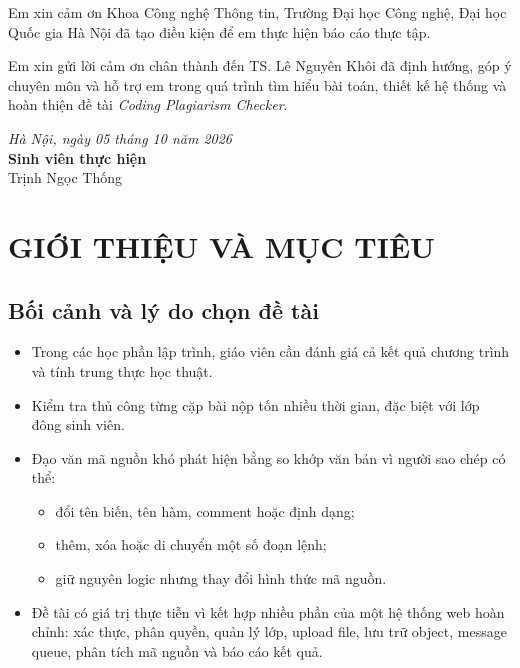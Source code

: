 \documentclass[12pt,a4paper]{article}
\begin{document}
Em xin cảm ơn Khoa Công nghệ Thông tin, Trường Đại học Công nghệ, Đại học Quốc gia Hà Nội đã tạo điều kiện để em thực hiện báo cáo thực tập.

Em xin gửi lời cảm ơn chân thành đến TS. Lê Nguyên Khôi đã định hướng, góp ý chuyên môn và hỗ trợ em trong quá trình tìm hiểu bài toán, thiết kế hệ thống và hoàn thiện đề tài \textit{Coding Plagiarism Checker}.

\vspace{0.8cm}
\begin{flushright}
    \textit{Hà Nội, ngày 05 tháng 10 năm 2026}\\
    \textbf{Sinh viên thực hiện}\\
    \vspace{1.2cm}
    Trịnh Ngọc Thống
\end{flushright}

\newpage
\tableofcontents
\newpage
{}

\section{GIỚI THIỆU VÀ MỤC TIÊU}

\subsection{Bối cảnh và lý do chọn đề tài}

\begin{itemize}
    \item Trong các học phần lập trình, giáo viên cần đánh giá cả kết quả chương trình và tính trung thực học thuật.
    \item Kiểm tra thủ công từng cặp bài nộp tốn nhiều thời gian, đặc biệt với lớp đông sinh viên.
    \item Đạo văn mã nguồn khó phát hiện bằng so khớp văn bản vì người sao chép có thể:
    \begin{itemize}
        \item đổi tên biến, tên hàm, comment hoặc định dạng;
        \item thêm, xóa hoặc di chuyển một số đoạn lệnh;
        \item giữ nguyên logic nhưng thay đổi hình thức mã nguồn.
    \end{itemize}
    \item Đề tài có giá trị thực tiễn vì kết hợp nhiều phần của một hệ thống web hoàn chỉnh: xác thực, phân quyền, quản lý lớp, upload file, lưu trữ object, message queue, phân tích mã nguồn và báo cáo kết quả.
\end{itemize}
\end{document}
